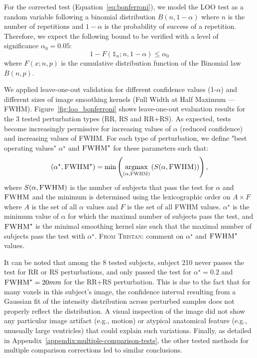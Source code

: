 \documentclass{article}
\newcommand{\TG}[1]{\color{blue}\textsc{From Tristan:} #1\color{black}\xspace}
\newcommand{\fwhm}{\textsc{FWHM}}
\begin{document}


For the corrected test
(Equation~\ref{eq:bonferroni}), we model the LOO test
as a random variable following a binomial distribution $B(n,1-\alpha)$
where $n$ is the number of repetitions and $1-\alpha$ is
the probability of success of a repetition. Therefore, we expect the following
bound to be verified with a level of significance
$\alpha_0=0.05$:
\[
    1 - F(\mathds{1}_n;n,1-\alpha) \leq \alpha_0
\]
where $F(x;n,p)$ is the cumulative distribution function of the Binomial law $B(n,p)$.

We applied leave-one-out validation for
different  confidence values (1-$\alpha$) and different sizes of image smoothing
kernels (Full Width at Half Maximum --- FWHM).
Figure~\ref{fig:loo_bonferroni} shows leave-one-out evaluation results
for the 3 tested perturbation types (RR, RS and RR+RS). As expected, tests
become increasingly permissive for increasing values of $\alpha$ (reduced
confidence) and increasing values of FWHM. For each type of perturbation, we
define "best operating values" $\alpha^\star$ and $\fwhm^\star$ for these parameters
such that:
\begin{equation}
    (\alpha^\star, \fwhm^\star) = \min\left(\underset{(\alpha, \fwhm)}{\mathrm{argmax}}\left( S(\alpha,\fwhm)\right)\right),
\end{equation}
where $S(\alpha, \fwhm)$ is the number of subjects that pass the test for
$\alpha$ and $\fwhm$ and the minimum is determined using the lexicographic
order on $A \times F$ where $A$ is the set of all $\alpha$ values and $F$ is the
set of all FWHM values. $\alpha^\star$ is the minimum value of $\alpha$ for which
the maximal number of subjects pass the test, and $\fwhm^\star$ is the minimal
smoothing kernel size such that the maximal number of subjects pass the test
with $\alpha^\star$. \TG{comment on $\alpha^\star$ and $\fwhm^\star$ values.}


It can be
noted that among the 8 tested subjects, subject 210 never passes the test for RR
or RS perturbations, and only passed the test for $\alpha^\star=0.2$ and
$\fwhm^\star=20mm$ for the RR+RS perturbation. This is due to the fact that for
many voxels in this subject's image, the confidence interval resulting from a
Gaussian fit of the intensity distribution across perturbed samples does not
properly reflect the distribution. A visual inspection of the image did not
show any particular image artifact (e.g., motion) or atypical anatomical feature
(e.g., unusually large ventricles) that could explain such variations. Finally,
as detailed in Appendix~\ref{appendix:multiple-comparison-tests}, the other
tested methods for multiple comparison corrections led to similar conclusions.
\end{document}
